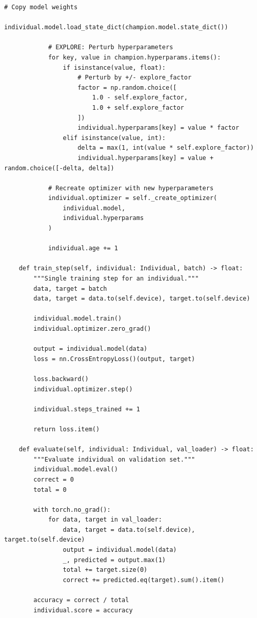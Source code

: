\begin{lstlisting}[style=python, caption=Population-based training implementation]
            # Copy model weights
            individual.model.load_state_dict(champion.model.state_dict())

            # EXPLORE: Perturb hyperparameters
            for key, value in champion.hyperparams.items():
                if isinstance(value, float):
                    # Perturb by +/- explore_factor
                    factor = np.random.choice([
                        1.0 - self.explore_factor,
                        1.0 + self.explore_factor
                    ])
                    individual.hyperparams[key] = value * factor
                elif isinstance(value, int):
                    delta = max(1, int(value * self.explore_factor))
                    individual.hyperparams[key] = value + random.choice([-delta, delta])

            # Recreate optimizer with new hyperparameters
            individual.optimizer = self._create_optimizer(
                individual.model,
                individual.hyperparams
            )

            individual.age += 1

    def train_step(self, individual: Individual, batch) -> float:
        """Single training step for an individual."""
        data, target = batch
        data, target = data.to(self.device), target.to(self.device)

        individual.model.train()
        individual.optimizer.zero_grad()

        output = individual.model(data)
        loss = nn.CrossEntropyLoss()(output, target)

        loss.backward()
        individual.optimizer.step()

        individual.steps_trained += 1

        return loss.item()

    def evaluate(self, individual: Individual, val_loader) -> float:
        """Evaluate individual on validation set."""
        individual.model.eval()
        correct = 0
        total = 0

        with torch.no_grad():
            for data, target in val_loader:
                data, target = data.to(self.device), target.to(self.device)
                output = individual.model(data)
                _, predicted = output.max(1)
                total += target.size(0)
                correct += predicted.eq(target).sum().item()

        accuracy = correct / total
        individual.score = accuracy


\end{lstlisting}
